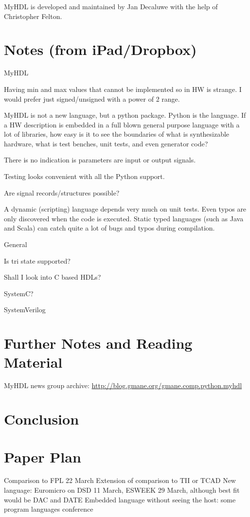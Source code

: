 \documentclass[10pt, conference, compsocconf]{IEEEtran}
\begin{document}
MyHDL is developed and maintained by Jan Decaluwe with the help of
Christopher Felton.  

\section{Notes (from iPad/Dropbox)}

MyHDL

Having min and max values that cannot be implemented so in HW is strange. I would prefer just signed/unsigned with a power of 2 range.

MyHDL is not a new language, but a python package. Python is the language. If a HW description is embedded in a full blown general purpose language with a lot of libraries, how easy is it to see the boundaries of what is synthesizable hardware, what is test benches, unit tests, and even generator code?

There is no indication is parameters are input or output signals.

Testing looks convenient with all the Python support.

Are signal records/structures possible?

A dynamic (scripting) language depends very much on unit tests. Even typos are only
discovered when the code is executed. Static typed languages (such as Java
and Scala) can catch quite a lot of bugs and typos during compilation.

General

Is tri state supported?

Shall I look into C based HDLs?

SystemC?

SystemVerilog

\section{Further Notes and Reading Material}

MyHDL news group archive: \url{http://blog.gmane.org/gmane.comp.python.myhdl}






\section{Conclusion}
\label{sec:conclusion}






\section{Paper Plan}

Comparison to FPL 22 March
Extension of comparison to TII or TCAD
New language: Euromicro on DSD 11 March, ESWEEK 29 March, although best fit would be DAC and DATE
Embedded language without seeing the host: some program languages conference
\end{document}
